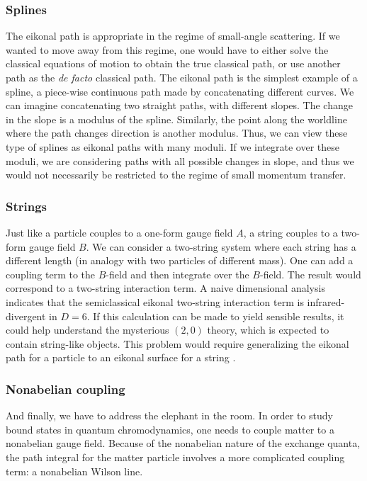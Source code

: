 \subsubsection*{Splines}
The eikonal path is appropriate in the regime of small-angle scattering. If we wanted to move away from this regime, one would have to either solve the classical equations of motion to obtain the true classical path, or use another path as the \textit{de facto} classical path. The eikonal path is the simplest example of a spline, a piece-wise continuous path made by concatenating different curves. We can imagine concatenating two straight paths, with different slopes. The change in the slope is a modulus of the spline. Similarly, the point along the worldline where the path changes direction is another modulus. Thus, we can view these type of splines as eikonal paths with many moduli. If we integrate over these moduli, we are considering paths with all possible changes in slope, and thus we would not necessarily be restricted to the regime of small momentum transfer.
\subsubsection*{Strings}
Just like a particle couples to a one-form gauge field $A$, a string couples to a two-form gauge field $B$. We can consider a two-string system where each string has a different length (in analogy with two particles of different mass). One can add a coupling term to the $B$-field and then integrate over the $B$-field. The result would correspond to a two-string interaction term. A naive dimensional analysis indicates that the semiclassical eikonal two-string interaction term is infrared-divergent in $D = 6$. If this calculation can be made to yield sensible results, it could help understand the mysterious $(2, 0)$ theory, which is expected to contain string-like objects. This problem would require generalizing the eikonal path for a particle to an eikonal surface for a string \cite{Janik:2000aj}.
\subsubsection*{Nonabelian coupling}
And finally, we have to address the elephant in the room. In order to study bound states in quantum chromodynamics, one needs to couple matter to a nonabelian gauge field. Because of the nonabelian nature of the exchange quanta, the path integral for the matter particle involves a more complicated coupling term: a nonabelian Wilson line.

